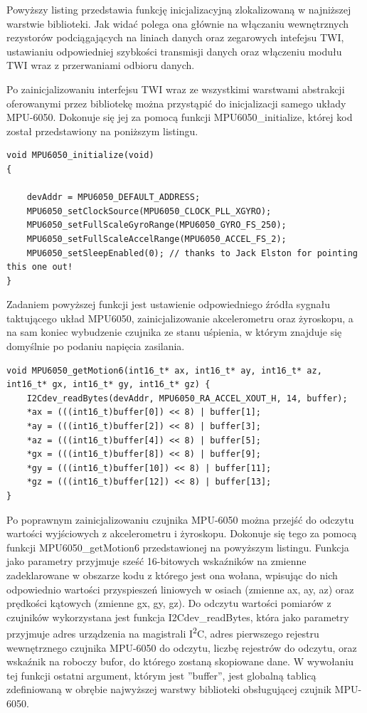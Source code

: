 Powyższy listing przedstawia funkcję inicjalizacyjną zlokalizowaną w najniższej warstwie biblioteki. Jak widać polega ona głównie na włączaniu wewnętrznych rezystorów podciągających na liniach danych oraz zegarowych intefejsu TWI, ustawianiu odpowiedniej szybkości transmisji danych oraz włączeniu modułu TWI wraz z przerwaniami odbioru danych.

Po zainicjalizowaniu interfejsu TWI wraz ze wszystkimi warstwami abstrakcji oferowanymi przez bibliotekę można przystąpić do inicjalizacji samego układy MPU-6050. Dokonuje się jej za pomocą funkcji MPU6050\_initialize, której kod został przedstawiony na poniższym listingu.

\begin{lstlisting}
void MPU6050_initialize(void) 
{
	
	devAddr = MPU6050_DEFAULT_ADDRESS;
    MPU6050_setClockSource(MPU6050_CLOCK_PLL_XGYRO);
    MPU6050_setFullScaleGyroRange(MPU6050_GYRO_FS_250);
    MPU6050_setFullScaleAccelRange(MPU6050_ACCEL_FS_2);
    MPU6050_setSleepEnabled(0); // thanks to Jack Elston for pointing this one out!
}
\end{lstlisting}

Zadaniem powyższej funkcji jest ustawienie odpowiedniego źródła sygnału taktującego układ MPU6050, zainicjalizowanie akcelerometru oraz żyroskopu, a na sam koniec wybudzenie czujnika ze stanu uśpienia, w którym znajduje się domyślnie po podaniu napięcia zasilania.

\begin{lstlisting}
void MPU6050_getMotion6(int16_t* ax, int16_t* ay, int16_t* az, int16_t* gx, int16_t* gy, int16_t* gz) {
    I2Cdev_readBytes(devAddr, MPU6050_RA_ACCEL_XOUT_H, 14, buffer);
    *ax = (((int16_t)buffer[0]) << 8) | buffer[1];
    *ay = (((int16_t)buffer[2]) << 8) | buffer[3];
    *az = (((int16_t)buffer[4]) << 8) | buffer[5];
    *gx = (((int16_t)buffer[8]) << 8) | buffer[9];
    *gy = (((int16_t)buffer[10]) << 8) | buffer[11];
    *gz = (((int16_t)buffer[12]) << 8) | buffer[13];
}
\end{lstlisting}

Po poprawnym zainicjalizowaniu czujnika MPU-6050 można przejść do odczytu wartości wyjściowych z akcelerometru i żyroskopu. Dokonuje się tego za pomocą funkcji MPU6050\_getMotion6 przedstawionej na powyższym listingu. Funkcja jako parametry przyjmuje sześć 16-bitowych wskaźników na zmienne zadeklarowane w obszarze kodu z którego jest ona wołana, wpisując do nich odpowiednio wartości przyspieszeń liniowych w osiach (zmienne ax, ay, az) oraz prędkości kątowych (zmienne gx, gy, gz). Do odczytu wartości pomiarów z czujników wykorzystana jest funkcja I2Cdev\_readBytes, która jako parametry przyjmuje adres urządzenia na magistrali I\textsuperscript{2}C, adres pierwszego rejestru wewnętrznego czujnika MPU-6050 do odczytu, liczbę rejestrów do odczytu, oraz wskaźnik na roboczy bufor, do którego zostaną skopiowane dane. W wywołaniu tej funkcji ostatni argument, którym jest ''buffer'', jest globalną tablicą zdefiniowaną w obrębie najwyższej warstwy biblioteki obsługującej czujnik MPU-6050.


